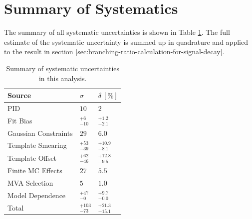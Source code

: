 \section{Summary of Systematics}

The summary of all systematic uncertainties is shown in Table \ref{tab:sys_summary}. The full estimate of the systematic uncertainty is summed up in quadrature and applied to the result in section \ref{sec:branching-ratio-calculation-for-signal-decay}.


\begin{table}[H]
	\centering
	\begin{tabular}{|l|l|l|}
		\hline
		Source & $\sigma$ & $\delta~[\%]$ \\
		\hline
		\hline
		PID & $10$ & $2$ \\
		\hline
		Fit Bias & $ {}^{+6}_{-10}$ & ${}^{+1.2}_{-2.1}$ \\
		\hline
		Gaussian Constraints & $29$ & $6.0$ \\
		\hline
		Template Smearing & ${}^{+53}_{-39}$ & ${}^{+10.9}_{-8.1}$ \\
		\hline
		Template Offset & ${}^{+62}_{-46}$ & ${}^{+12.8}_{-9.5}$ \\
		\hline
		Finite MC Effects & $27$ & $5.5$ \\
		\hline
		MVA Selection & $5$ & $1.0$\\
		\hline
		Model Dependence & ${}^{+47}_{-0}$ & ${}^{+9.7}_{-0.0}$ \\
		\hline
		\hline
		Total & ${} ^{+103}_{-73}$ & ${}^{+21.3}_{-15.1}$ \\
		\hline
	\end{tabular}
	\captionsetup{width=0.8\linewidth}
	\caption{Summary of systematic uncertainties in this analysis.}
	\label{tab:sys_summary}
\end{table}







